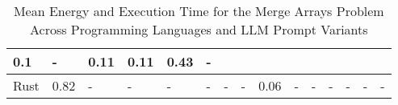 \begin{table}[]
{\begin{tabular}{|l|lllllll|lllllll|}
  \multicolumn{1}{l|}{{\color[HTML]{666666} 0.1}} &
  \multicolumn{1}{l|}{{\color[HTML]{666666} -}} &
  \multicolumn{1}{l|}{{\color[HTML]{666666} 0.11}} &
  \multicolumn{1}{l|}{{\color[HTML]{666666} 0.11}} &
  \multicolumn{1}{l|}{{\color[HTML]{666666} 0.43}} &
  {\color[HTML]{666666} -} \\ \hline
{\color[HTML]{666666} Rust} &
  \multicolumn{1}{l|}{{\color[HTML]{666666} 0.82}} &
  \multicolumn{1}{l|}{{\color[HTML]{666666} -}} &
  \multicolumn{1}{l|}{{\color[HTML]{666666} -}} &
  \multicolumn{1}{l|}{{\color[HTML]{666666} -}} &
  \multicolumn{1}{l|}{{\color[HTML]{666666} -}} &
  \multicolumn{1}{l|}{{\color[HTML]{666666} -}} &
  {\color[HTML]{666666} -} &
  \multicolumn{1}{l|}{{\color[HTML]{666666} 0.06}} &
  \multicolumn{1}{l|}{{\color[HTML]{666666} -}} &
  \multicolumn{1}{l|}{{\color[HTML]{666666} -}} &
  \multicolumn{1}{l|}{{\color[HTML]{666666} -}} &
  \multicolumn{1}{l|}{{\color[HTML]{666666} -}} &
  \multicolumn{1}{l|}{{\color[HTML]{666666} -}} &
  {\color[HTML]{666666} -} \\ \hline
\end{tabular}%
}
\centering
\caption{Mean Energy and Execution Time for the Merge Arrays Problem Across Programming Languages and LLM Prompt Variants}
\end{table}